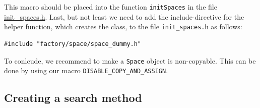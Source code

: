\documentclass[runningheads,a4paper]{llncs}
\newcommand{\replocfile}{https://github.com/searchivarius/nmslib/blob/v1.5/}
\newcommand{\ttt}[1]{\texttt{#1}}
\begin{document}
This macro should be placed into the function \ttt{initSpaces} in the 
file 
\href{\replocfile similarity_search/include/factory/init\_spaces.h}{init\_spaces.h}.
Last, but not least we need to add the include-directive
for the helper function, which creates
the class, to the file \ttt{init\_spaces.h} as follows:
\begin{verbatim}
#include "factory/space/space_dummy.h"
\end{verbatim}

To conlcude, we recommend to make a \ttt{Space} object is non-copyable. 
This can be done by using our macro \ttt{DISABLE\_COPY\_AND\_ASSIGN}.


\subsection{Creating a search method}\label{SectionCreateMethod}
\end{document}

